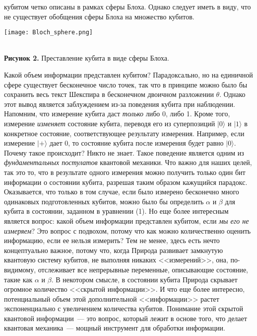 \begin{multicols}{2}
{    кубитом четко описаны в рамках сферы Блоха. Однако следует иметь в виду, что не существует обобщения сферы Блоха на множество кубитов.
    }
    \begin{center}
    \begin{minipage}{0.3\textwidth}{\texttt{[image: Bloch\_sphere.png]}}
    \end{minipage}\\
    \vspace{0.3cm}
    \footnotesize{\textbf{Рисунок 2.} Преставление кубита в виде сферы Блоха.}
    \end{center}
    \normalsize{
    Какой объем информации представлен кубитом? Парадоксально,
    но на единичной сфере существует бесконечное число точек, так что в принципе можно было бы сохранить весь текст Шекспира в бесконечном двоичном разложении $\theta$. Однако этот вывод
    является заблуждением из-за поведения кубита при наблюдении. Напомним, что
    измерение кубита даст \emph{только} либо 0, либо 1. Кроме того, измерение \emph{изменяет}
    состояние кубита, переводя его из суперпозиций $\vert0\rangle$ и $\vert1\rangle$ в конкретное состояние,
    соответствующее результату измерения. Например, если измерение $\vert+\rangle$ дает 0,
    то состояние кубита после измерения будет равно $\vert0\rangle$. Почему такое происходит? Никто не знает. Такое поведение является одним из \emph{фундаментальных постулатов} квантовой механики. Что важно для наших целей, так это то, что в результате одного измерения можно получить только один бит информации о состоянии кубита, разрешая таким образом кажущийся парадокс. Оказывается, что только в том случае, если было измерено бесконечно много одинаковых подготовленных кубитов, можно было бы определить $\alpha$ и $\beta$ для кубита в состоянии, заданном в уравнении (1).
    Но еще более интересным является вопрос: какой объем информации
    представлен кубитом, если \emph{мы его не измеряем}? Это вопрос с подвохом, потому что как
    можно количественно оценить информацию, если ее нельзя измерить? Тем не менее, здесь есть нечто
    концептуально важное, потому что, когда Природа развивает замкнутую квантовую систему
    кубитов, не выполняя никаких <<измерений>>, она, по-видимому, отслеживает все
    непрерывные переменные, описывающие состояние, такие как $\alpha$ и $\beta$. В некотором смысле, в состоянии кубита Природа скрывает огромное количество <<скрытой информации>>. И что еще более интересно, потенциальный объем этой дополнительной <<информации>> растет экспоненциально с
    увеличением количества кубитов. Понимание этой скрытой квантовой информации~--- это вопрос, который лежит в основе того, что делает квантовая механика~--- мощный инструмент для обработки информации.
    }

\end{multicols}
